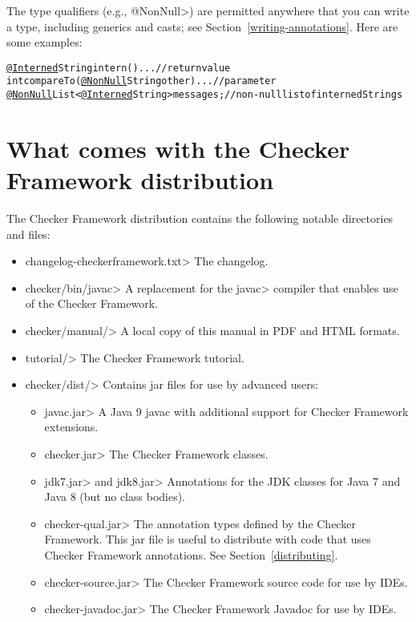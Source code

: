 The type qualifiers (e.g., \<@NonNull>) are permitted anywhere
that you can write a type, including generics and casts; see
Section~\ref{writing-annotations}.  Here are some examples:

\begin{alltt}
  \underline{@Interned} String intern() \ttlcb{} ... \ttrcb{}             // return value
  int compareTo(\underline{@NonNull} String other) \ttlcb{} ... \ttrcb{}  // parameter
  \underline{@NonNull} List<\underline{@Interned} String> messages;     // non-null list of interned Strings
\end{alltt}


\section{What comes with the Checker Framework distribution\label{release-content}}

The Checker Framework distribution contains the following notable
directories and files:

\begin{itemize}
\item \<changelog-checkerframework.txt> The changelog.
\item \<checker/bin/javac> A replacement for the \<javac> compiler that
  enables use of the Checker Framework.
\item \<checker/manual/> A local copy of this manual in PDF and HTML formats.
\item \<tutorial/> The Checker Framework tutorial.
\item \<checker/dist/> Contains jar files for use by advanced users:
  \begin{itemize}
  \item \<javac.jar> A Java 9 javac with additional support for
  Checker Framework extensions.
  \item \<checker.jar> The Checker Framework classes.
  \item \<jdk7.jar> and \<jdk8.jar> Annotations for the JDK classes for
  Java 7 and Java 8 (but no class bodies).
  \item \<checker-qual.jar> The annotation types defined by the
  Checker Framework. This jar file is useful to distribute with code
  that uses Checker Framework annotations. See Section~\ref{distributing}.
  \item \<checker-source.jar> The Checker Framework source code for
  use by IDEs.
  \item \<checker-javadoc.jar> The Checker Framework Javadoc for use
  by IDEs.
  \end{itemize}
\end{itemize}

